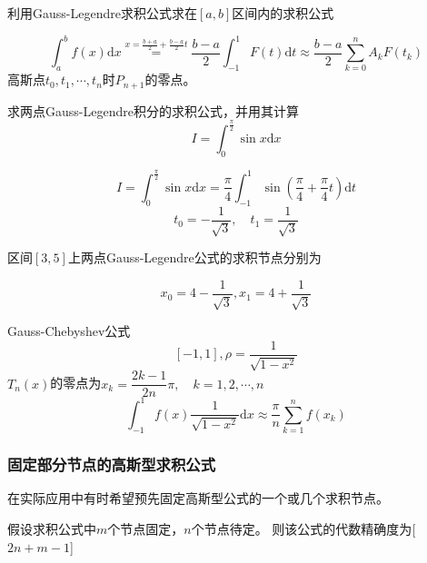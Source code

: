 \begin{example}
    利用Gauss-Legendre求积公式求在$[a,b]$区间内的求积公式
    \begin{solution}
        \[
            \int_{a}^{b}f(x)\mathrm{d}x \overset{x = \frac{b+a}{2}+\frac{b-a}{2}t}{=} \dfrac{b-a}{2}\int_{-1}^{1}F(t)\mathrm{d}t\approx\dfrac{b-a}{2}\sum_{k = 0}^{n}A_{k}F(t_k)
        \]
        高斯点$t_0,t_1,\cdots,t_n$时$P_{n+1}$的零点。
    \end{solution}
\end{example}
\begin{example}
    求两点Gauss-Legendre积分的求积公式，并用其计算
    \[
        I = \int_{0}^{\frac{\pi}{2}}\sin x\mathrm{d}x
    \]

    \begin{solution}
        \[
            I =  \int_{0}^{\frac{\pi}{2}}\sin x\mathrm{d}x = \dfrac{\pi}{4}\int_{-1}^{1}\sin(\dfrac{\pi}{4} + \dfrac{\pi}{4}t)\mathrm{d}t
        \]
        \[
            t_0 = -\dfrac{1}{\sqrt{3}},\quad t_1 = \dfrac{1}{\sqrt{3}}
        \]
    \end{solution}
\end{example}
\begin{example}
    区间$[3,5]$上两点Gauss-Legendre公式的求积节点分别为
    \begin{solution}
        \[
            x_0 = 4-\dfrac{1}{\sqrt{3}},x_{1} =4+\dfrac{1}{\sqrt{3}} 
        \]
    \end{solution}
\end{example}
\begin{note}
    Gauss-Chebyshev公式
    \[
        [-1,1],\rho = \dfrac{1}{\sqrt{1-x^2}}
    \]
    $T_{n}(x)$的零点为$x_{k} = \dfrac{2k-1}{2n}\pi,\quad k = 1,2,\cdots,n$
    \[
        \int_{-1}^{1}f(x)\dfrac{1}{\sqrt{1-x^2}}\mathrm{d}x\approx \dfrac{\pi}{n}\sum_{k = 1}^{n}f(x_k)
    \]
\end{note}
\subsubsection{固定部分节点的高斯型求积公式}
在实际应用中有时希望预先固定高斯型公式的一个或几个求积节点。
\begin{example}
    假设求积公式中$m$个节点固定，$n$个节点待定。
    \newline
    则该公式的代数精确度为\colorbox{cyan!50}{[$2n+m-1$]}
\end{example}

